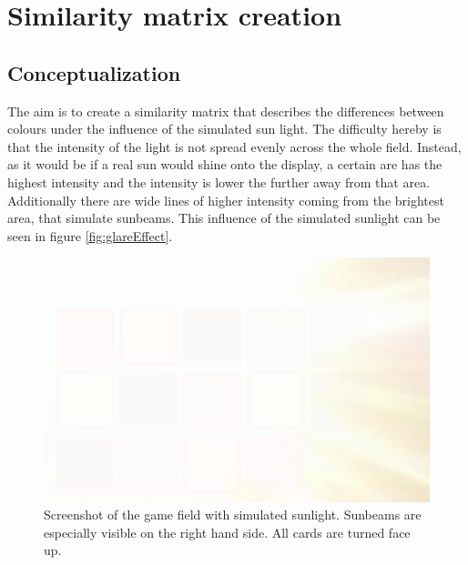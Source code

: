 \newpage

\section{Similarity matrix creation}
\label{similarity_matrix_cretion}

\subsection{Conceptualization}
\label{conceptualization}
The aim is to create a similarity matrix that describes the differences between colours under the influence of the simulated sun light. The difficulty hereby is that the intensity of the light is not spread evenly across the whole field. Instead, as it would be if a real sun would shine onto the display, a certain are has the highest intensity and the intensity is lower the further away from that area. Additionally there are wide lines of higher intensity coming from the brightest area, that simulate sunbeams. This influence of the simulated sunlight can be seen in figure \ref{fig:glareEffect}. 

\begin{figure}[H]
	\centering
	\includegraphics[width=14cm]{images/glareEffect.png}
	\caption[Bild kurz]{Screenshot of the game field with simulated sunlight. Sunbeams are especially visible on the right hand side. All cards are turned face up.}
	\label{fig:glareEffect2}
\end{figure}

